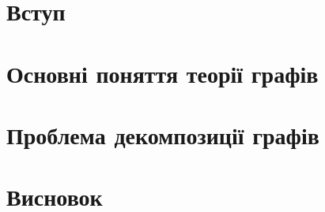 \documentclass[a4paper,14pt,ukrainian]{extarticle}
\begin{document}


\tableofcontents
\newpage

\section*{\centering Вступ}

\newpage

\section{Основні поняття теорії графів}

\newpage

\section{Проблема декомпозиції графів}


\clearpage
\section*{\centering Висновок}


\clearpage
{}


\end{document}
